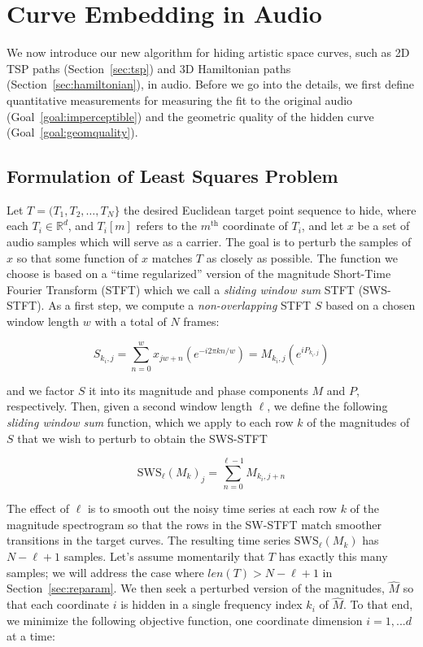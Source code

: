\documentclass[runningheads]{llncs}
\begin{document}
\section{Curve Embedding in Audio}

We now introduce our new algorithm for hiding artistic space curves, such as 2D TSP paths (Section~\ref{sec:tsp}) and 3D Hamiltonian paths (Section~\ref{sec:hamiltonian}), in audio.  Before we go into the details, we first define quantitative measurements for measuring the fit to the original audio (Goal~\ref{goal:imperceptible}) and the geometric quality of the hidden curve (Goal~\ref{goal:geomquality}).  

\subsection{Formulation of Least Squares Problem}

Let $T = (T_1, T_2, \hdots, T_N \}$ the desired Euclidean target point sequence to hide, where each $T_i \in \mathbb{R}^d$, and $T_i[m]$ refers to the $m^{\text{th}}$ coordinate of $T_i$, and let $x$ be a set of audio samples which will serve as a carrier.  The goal is to perturb the samples of $x$ so that some function of $x$ matches $T$ as closely as possible.  The function we choose is based on a ``time regularized'' version of the magnitude Short-Time Fourier Transform (STFT) which we call a {\em sliding window sum} STFT (SWS-STFT).  As a first step, we compute a {\em non-overlapping} STFT $S$ based on a chosen window length $w$ with a total of $N$ frames:

\begin{equation}
  S_{k_i, j} = \sum_{n = 0}^w x_{jw + n} \left(e^{-i 2 \pi k n / w} \right) = M_{k_i, j} \left( e^{i P_{k_i, j}} \right)
\end{equation}

and we factor $S$ it into its magnitude and phase components $M$ and $P$, respectively.  Then, given a second window length $\ell$, we define the following {\em sliding window sum} function, which we apply to each row $k$ of the magnitudes of $S$ that we wish to perturb to obtain the SWS-STFT

\begin{equation}
  \text{SWS}_{\ell}\left({M_k}\right)_j = \sum_{n = 0}^{\ell-1} M_{k_i, j+n}
\end{equation}

The effect of $\ell$ is to smooth out the noisy time series at each row $k$ of the magnitude spectrogram so that the rows in the SW-STFT match smoother transitions in the target curves.  The resulting time series $\text{SWS}_{\ell}\left({M_k}\right)$ has $N-\ell+1$ samples.  Let's assume momentarily that $T$ has exactly this many samples; we will address the case where $len(T) > N-\ell+1$ in Section~\ref{sec:reparam}.  We then seek a perturbed version of the magnitudes, $\hat{M}$ so that each coordinate $i$ is hidden in a single frequency index $k_i$ of $\hat{M}$.  To that end, we minimize the following objective function, one coordinate dimension $i = 1, ... d$ at a time:
\end{document}
